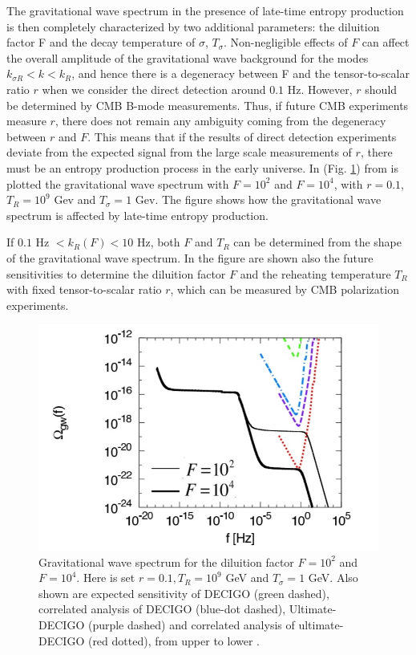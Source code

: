 \documentclass[11pt,a4paper,twoside]{book}
\begin{document}
The gravitational wave spectrum in the presence of late-time entropy production is then completely characterized by two additional parameters: the diluition factor F and the decay temperature of $\sigma$, $ T_{\sigma} $. Non-negligible effects of $ F $ can affect the overall amplitude of the gravitational wave background for the modes $ k_{\sigma R} < k < k_{R} $, and hence there is a degeneracy between F and the tensor-to-scalar ratio $ r $ when we consider the direct detection around $ 0.1 $ Hz. However, $ r $ should be determined by CMB B-mode measurements. Thus, if future CMB experiments measure $ r $, there does not remain any ambiguity coming from the degeneracy between $ r $ and $ F $. This means that if the results of direct detection experiments deviate from the expected signal from the large scale measurements of $ r $, there must be an entropy production process in the early universe. In (Fig. \ref{fig:nakayamasaitofig6}) from \cite{Chap3:ProibingReheatingTemperature2008} is plotted the gravitational wave spectrum with $ F=10^{2} $ and $ F=10^{4} $, with $ r=0.1 $, $ T_{R}=10^{9} $  Gev and $ T_{\sigma} = 1 $ Gev. The figure shows how the gravitational wave spectrum is affected by late-time entropy production.

If $ 0.1$ Hz $ < k_{R}(F) <10$ Hz, both $ F $ and $ T_{R} $ can be determined from the shape of the gravitational wave spectrum. In the figure are shown also the future sensitivities to determine the diluition factor $ F $ and the reheating temperature $ T_{R} $ with fixed tensor-to-scalar ratio $ r $, which can be measured by CMB polarization experiments.
\begin{figure}
	\centering
	\includegraphics[width=0.8\linewidth, height=0.3\textheight]{Images/Chap3/Nakayama_Saito_SecondPlot}
	\caption{Gravitational wave spectrum for the diluition factor $ F=10^{2} $ and $ F=10^{4} $. Here is set $ r=0.1, T_{R}=10^{9} $ GeV and $ T_{\sigma}=1 $ GeV. Also shown are expected sensitivity of DECIGO (green dashed), correlated analysis of DECIGO (blue-dot dashed), Ultimate-DECIGO (purple dashed) and correlated analysis of ultimate-DECIGO (red dotted), from upper to lower \cite{Chap3:ProibingReheatingTemperature2008}.}
	\label{fig:nakayamasaitofig6}
\end{figure}
\end{document}
